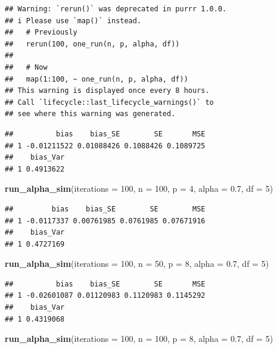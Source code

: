 \documentclass[
]{book}
\newenvironment{Shaded}{\begin{snugshade}}{\end{snugshade}}
\newcommand{\AttributeTok}[1]{\textcolor[rgb]{0.13,0.29,0.53}{#1}}
\newcommand{\DecValTok}[1]{\textcolor[rgb]{0.00,0.00,0.81}{#1}}
\newcommand{\FloatTok}[1]{\textcolor[rgb]{0.00,0.00,0.81}{#1}}
\newcommand{\FunctionTok}[1]{\textcolor[rgb]{0.13,0.29,0.53}{\textbf{#1}}}
\newcommand{\NormalTok}[1]{#1}
\begin{document}
\begin{verbatim}
## Warning: `rerun()` was deprecated in purrr 1.0.0.
## i Please use `map()` instead.
##   # Previously
##   rerun(100, one_run(n, p, alpha, df))
## 
##   # Now
##   map(1:100, ~ one_run(n, p, alpha, df))
## This warning is displayed once every 8 hours.
## Call `lifecycle::last_lifecycle_warnings()` to
## see where this warning was generated.
\end{verbatim}

\begin{verbatim}
##          bias    bias_SE        SE       MSE
## 1 -0.01211522 0.01088426 0.1088426 0.1089725
##    bias_Var
## 1 0.4913622
\end{verbatim}

\begin{Shaded}
\begin{Highlighting}[]
\FunctionTok{run\_alpha\_sim}\NormalTok{(}\AttributeTok{iterations =} \DecValTok{100}\NormalTok{, }\AttributeTok{n =} \DecValTok{100}\NormalTok{, }\AttributeTok{p =} \DecValTok{4}\NormalTok{, }\AttributeTok{alpha =} \FloatTok{0.7}\NormalTok{, }\AttributeTok{df =} \DecValTok{5}\NormalTok{)}
\end{Highlighting}
\end{Shaded}

\begin{verbatim}
##         bias    bias_SE        SE        MSE
## 1 -0.0117337 0.00761985 0.0761985 0.07671916
##    bias_Var
## 1 0.4727169
\end{verbatim}

\begin{Shaded}
\begin{Highlighting}[]
\FunctionTok{run\_alpha\_sim}\NormalTok{(}\AttributeTok{iterations =} \DecValTok{100}\NormalTok{, }\AttributeTok{n =} \DecValTok{50}\NormalTok{, }\AttributeTok{p =} \DecValTok{8}\NormalTok{, }\AttributeTok{alpha =} \FloatTok{0.7}\NormalTok{, }\AttributeTok{df =} \DecValTok{5}\NormalTok{)}
\end{Highlighting}
\end{Shaded}

\begin{verbatim}
##          bias    bias_SE        SE       MSE
## 1 -0.02601087 0.01120983 0.1120983 0.1145292
##    bias_Var
## 1 0.4319068
\end{verbatim}

\begin{Shaded}
\begin{Highlighting}[]
\FunctionTok{run\_alpha\_sim}\NormalTok{(}\AttributeTok{iterations =} \DecValTok{100}\NormalTok{, }\AttributeTok{n =} \DecValTok{100}\NormalTok{, }\AttributeTok{p =} \DecValTok{8}\NormalTok{, }\AttributeTok{alpha =} \FloatTok{0.7}\NormalTok{, }\AttributeTok{df =} \DecValTok{5}\NormalTok{)}
\end{Highlighting}
\end{Shaded}
\end{document}

